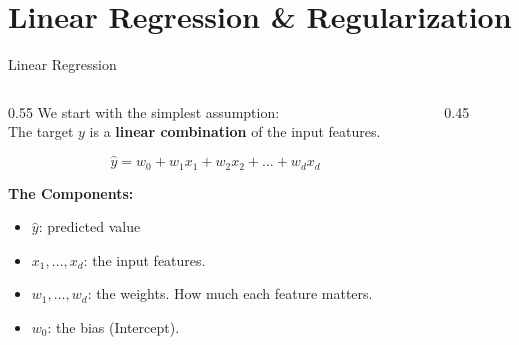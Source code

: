 \section{Linear Regression \& Regularization}
\begin{frame}{Linear Regression}
    \begin{columns}[c]
        \begin{column}{0.55\textwidth}
            We start with the simplest assumption: \\
            The target $y$ is a \textbf{linear combination} of the input features.
            
            $$ \hat{y} = w_0 + w_1 x_1 + w_2 x_2 + \dots + w_d x_d $$
            
            \vspace{1em}
            \textbf{The Components:}
            \begin{itemize}
                \item $\hat{y}$: predicted value
                \item $x_1, \dots, x_d$: the input features.
                \item $w_1, \dots, w_d$: the weights. How much each feature matters.
                \item $w_0$: the bias (Intercept). 
                
            \end{itemize}
        \end{column}

       \begin{column}{0.45\textwidth}
            \centering
        \end{column}
    \end{columns}
\end{frame}

